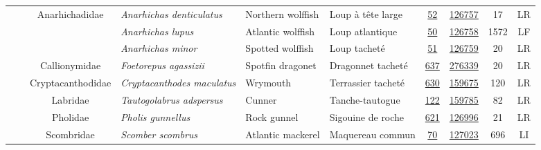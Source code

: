 \documentclass[12pt]{article}\usepackage[]{graphicx}\usepackage[]{color}
\begin{document}
\begin{landscapepage}
\begin{longtable}[t]{ccc>{\centering\arraybackslash}p{3cm}>{\centering\arraybackslash}p{3cm}>{\centering\arraybackslash}p{3cm}>{}c>{}ccc}
\hspace{1em}\hspace{1em} &  & Anarhichadidae & \em{Anarhichas denticulatus} & Northern wolffish & Loup à tête large & \href{#sec:351}{52} & \href{http://www.marinespecies.org/aphia.php?p=taxdetails&id=125588}{126757} & 17 & LR\\
\hspace{1em}\hspace{1em} &  &  & \em{Anarhichas lupus} & Atlantic wolffish & Loup atlantique & \href{#sec:501}{50} & \href{http://www.marinespecies.org/aphia.php?p=taxdetails&id=127214}{126758} & 1572 & LF\\
\hspace{1em}\hspace{1em} &  &  & \em{Anarhichas minor} & Spotted wolffish & Loup tacheté & \href{#sec:502}{51} & \href{http://www.marinespecies.org/aphia.php?p=taxdetails&id=127217}{126759} & 20 & LR\\
\hspace{1em}\hspace{1em} &  & Callionymidae & \em{Foetorepus agassizii} & Spotfin dragonet & Dragonnet tacheté & \href{#sec:503}{637} & \href{http://www.marinespecies.org/aphia.php?p=taxdetails&id=159524}{276339} & 20 & LR\\
\hspace{1em}\hspace{1em} &  & Cryptacanthodidae & \em{Cryptacanthodes maculatus} & Wrymouth & Terrassier tacheté & \href{#sec:505}{630} & \href{http://www.marinespecies.org/aphia.php?p=taxdetails&id=127218}{159675} & 120 & LR\\
\hspace{1em}\hspace{1em} &  & Labridae & \em{Tautogolabrus adspersus} & Cunner & Tanche-tautogue & \href{#sec:512}{122} & \href{http://www.marinespecies.org/aphia.php?p=taxdetails&id=159526}{159785} & 82 & LR\\
\hspace{1em}\hspace{1em} &  & Pholidae & \em{Pholis gunnellus} & Rock gunnel & Sigouine de roche & \href{#sec:520}{621} & \href{http://www.marinespecies.org/aphia.php?p=taxdetails&id=127212}{126996} & 21 & LR\\
\hspace{1em}\hspace{1em} &  & Scombridae & \em{Scomber scombrus} & Atlantic mackerel & Maquereau commun & \href{#sec:880}{70} & \href{http://www.marinespecies.org/aphia.php?p=taxdetails&id=127193}{127023} & 696 & LI\\

\end{longtable}
\end{landscapepage}
\end{document}
